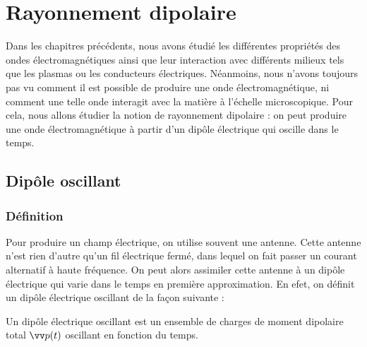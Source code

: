 \documentclass[11pt,fleqn]{book} %
\begin{document}










\setcounter{chapter}{18}

\chapter{Rayonnement dipolaire}

Dans les chapitres précédents, nous avons étudié les différentes propriétés des ondes électromagnétiques ainsi que leur interaction avec différents milieux tels que les plasmas ou les conducteurs électriques. Néanmoins, nous n'avons toujours pas vu comment il est possible de produire une onde électromagnétique, ni comment une telle onde interagit avec la matière à l'échelle microscopique. Pour cela, nous allons étudier la notion de rayonnement dipolaire : on peut produire une onde électromagnétique à partir d'un dipôle électrique qui oscille dans le temps.

\section{Dipôle oscillant}

\subsection{Définition}

Pour produire un champ électrique, on utilise souvent une antenne. Cette antenne n'est rien d'autre qu'un fil électrique fermé, dans lequel on fait passer un courant alternatif à haute fréquence. On peut alors assimiler cette antenne à un dipôle électrique qui varie dans le temps en première approximation. En efet, on définit un dipôle électrique oscillant de la façon suivante :
\begin{definition}
	Un dipôle électrique oscillant est un ensemble de charges de moment dipolaire total $\vv p(t)$ oscillant en fonction du temps.
\end{definition}
\end{document}
